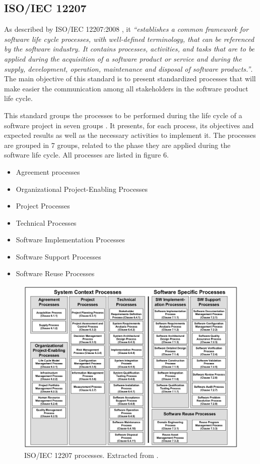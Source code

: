 \subsection{ISO/IEC 12207}

As described by ISO/IEC 12207:2008 \cite{ISO12207}, it \textit{``establishes a common framework for software life cycle processes, with well-defined terminology, that can be referenced by the software industry. It contains processes, activities, and tasks that are to be applied during the acquisition of a software product or service and during the supply, development, operation, maintenance and disposal of software products.''}. The main objective of this standard is to present standardized processes that will make easier the communication among all stakeholders in the software product life cycle.\par
This standard groups the processes to be performed during the life cycle of a software project in seven groups . It presents, for each process, its objectives and expected results as well as the necessary activities to implement it. The processes are grouped in 7 groups, related to the phase they are applied during the software life cycle. All processes are listed in figure 6.

\begin{itemize}
  \item Agreement processes
  \item Organizational Project-Enabling Processes
  \item Project Processes
  \item Technical Processes
  \item Software Implementation Processes
  \item Software Support Processes
  \item Software Reuse Processes 
\end{itemize}

 
\begin{figure}[h!]
\centering
\includegraphics[width=\textwidth]{img/ISO12207Processes.png}
\caption{ISO/IEC 12207 processes. Extracted from \cite{ISO12207}.}
\end{figure}

